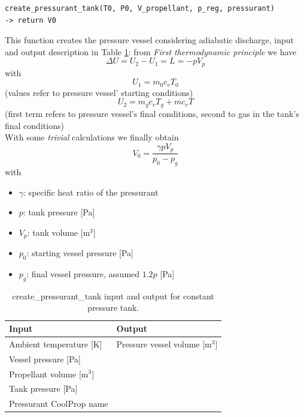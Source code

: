\begin{verbatim}
create_pressurant_tank(T0, P0, V_propellant, p_reg, pressurant)
-> return V0
\end{verbatim}
\hspace*{2em} This function creates the pressure vessel considering adiabatic discharge, input and output description in Table \ref{Tab: CreatePressurised}: from \textit{First thermodynamic principle} we have
\begin{equation}
    \Delta U=U_2-U_1 =L=-pV_p
\end{equation}
with
\begin{equation*}
    U_1 = m_0c_vT_0
\end{equation*}
(values refer to pressure vessel' starting conditions)
\begin{equation*}
    U_2 = m_gc_vT_g + mc_vT
\end{equation*}
(first term refers to pressure vessel's final conditions, second to gas in the tank's final conditions)\\
With some \textit{trivial} calculations we finally obtain
\begin{equation}
    V_0=\frac{\gamma pV_p}{p_0-p_g}
\end{equation}
with
\begin{itemize}
    \item $\gamma$: specific heat ratio of the pressurant
    \item $p$: tank pressure [Pa]
    \item $V_p$: tank volume [m$^3$]
    \item $p_0$: starting vessel pressure [Pa]
    \item $p_g$: final vessel pressure, assumed $1.2p$ [Pa]
\end{itemize}

\begin{table}[h!]
\centering
\begin{tabular}{l|l}
\hline
\textbf{Input} & \textbf{Output}\\
\hline
Ambient temperature [K] & Pressure vessel volume [m$^3$]\\
Vessel pressure [Pa] & \\
Propellant volume [m$^3$] & \\
Tank pressure [Pa] & \\
Pressurant CoolProp name & \\
\hline
\end{tabular}
\caption{create\_pressurant\_tank input and output for constant pressure tank.}
\label{Tab: CreatePressurised}
\end{table}

